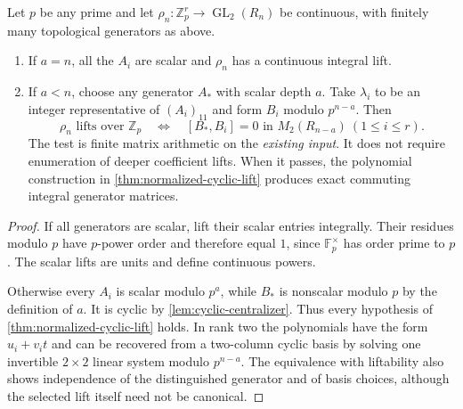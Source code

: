 \begin{theorem}\label{thm:rank-two-profinite}
Let $p$ be any prime and let $\rho_n:\mathbb Z_p^r\to\operatorname{GL}_2(R_n)$ be continuous, with finitely many topological generators as above.
\begin{enumerate}
\item If $a=n$, all the $A_i$ are scalar and $\rho_n$ has a continuous integral lift.
\item If $a<n$, choose any generator $A_*$ with scalar depth $a$. Take $\lambda_i$ to be an integer representative of $(A_i)_{11}$ and form $B_i$ modulo $p^{n-a}$. Then
\[
 \boxed{\rho_n\text{ lifts over }\mathbb Z_p
 \quad\Longleftrightarrow\quad
 [B_*,B_i]=0\text{ in }M_2(R_{n-a})\ (1\leq i\leq r).}
\]
The test is finite matrix arithmetic on the \emph{existing input}. It does not require enumeration of deeper coefficient lifts. When it passes, the polynomial construction in \cref{thm:normalized-cyclic-lift} produces exact commuting integral generator matrices.
\end{enumerate}
\end{theorem}
\begin{proof}
If all generators are scalar, lift their scalar entries integrally. Their residues modulo $p$ have $p$-power order and therefore equal $1$, since $\mathbb F_p^\times$ has order prime to $p$. The scalar lifts are units and define continuous powers.

Otherwise every $A_i$ is scalar modulo $p^a$, while $B_*$ is nonscalar modulo $p$ by the definition of $a$. It is cyclic by \cref{lem:cyclic-centralizer}. Thus every hypothesis of \cref{thm:normalized-cyclic-lift} holds. In rank two the polynomials have the form $u_i+v_it$ and can be recovered from a two-column cyclic basis by solving one invertible $2\times2$ linear system modulo $p^{n-a}$. The equivalence with liftability also shows independence of the distinguished generator and of basis choices, although the selected lift itself need not be canonical.
\end{proof}

